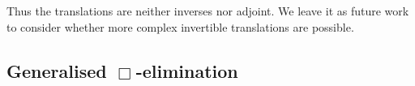 Thus the translations are neither inverses nor adjoint. We leave it as future work to
consider whether more complex invertible translations are possible.

\subsection{Generalised $\Box$-elimination}
\label{sec:flattening}

